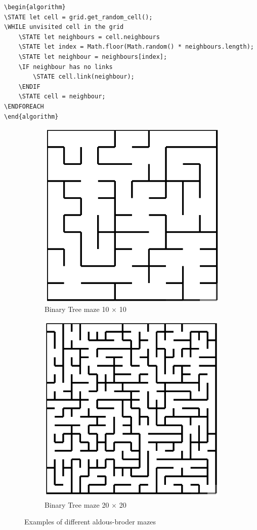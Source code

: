 \begin{lstlisting}[caption={Pseudocode for an Aldous-Broder algorithm}]
\begin{algorithm}
\STATE let cell = grid.get_random_cell();
\WHILE unvisited cell in the grid
	\STATE let neighbours = cell.neighbours
	\STATE let index = Math.floor(Math.random() * neighbours.length);
	\STATE let neighbour = neighbours[index];
	\IF neighbour has no links
		\STATE cell.link(neighbour);
	\ENDIF
	\STATE cell = neighbour;
\ENDFOREACH
\end{algorithm}
\end{lstlisting}

\begin{figure}[h]
	\centering
	\begin{subfigure}{.5\textwidth}
	  \centering
	  \includegraphics[width=.5\linewidth]{aldous1010}
	  \caption{Binary Tree maze 10 $\times$ 10}
	  \label{fig:sub1}
	\end{subfigure}
	\begin{subfigure}{.5\textwidth}
	  \centering
	  \includegraphics[width=.5\linewidth]{aldous2020}
	  \caption{Binary Tree maze 20 $\times$ 20}
	  \label{fig:sub2}
	\end{subfigure}
	\caption{Examples of different aldous-broder mazes}
	\label{fig:test}
	\end{figure}

